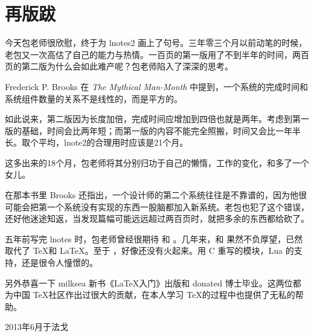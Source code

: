 \chapter{再版跋}

今天包老师很欣慰，终于为 lnotes2 画上了句号。三年零三个月以前动笔的时候，老包又一次高估了自己的能力与热情。一百页的第一版用了不到半年的时间，两百页的第二版为什么会如此难产呢？包老师陷入了深深的思考。

Frederick P. Brooks 在 \emph{The Mythical Man-Month} 中提到，一个系统的完成时间和系统组件数量的关系不是线性的，而是平方的。

如此说来，第二版因为长度加倍，完成时间应增加到四倍也就是两年。考虑到第一版的基础，时间会比两年短；而第一版的内容不能完全照搬，时间又会比一年半长。取个平均，lnote2的合理用时应该是21个月。

这多出来的18个月，包老师将其分别归功于自己的懒惰，工作的变化，和多了一个女儿。

在那本书里 Brooks 还指出，一个设计师的第二个系统往往是不靠谱的，因为他很可能会把第一个系统没有实现的东西一股脑都加入新系统。老包也犯了这个错误，还好他迷途知返，当发现篇幅可能远远超过两百页时，就把多余的东西都给砍了。

五年前写完 lnotes 时，包老师曾经很期待 \XeTeX 和 \LuaTeX。几年来，\XeTeX 和 \XeLaTeX 果然不负厚望，已然取代了 \TeX 和 \LaTeX。至于 \LuaTeX，好像还没有火起来。用 C 重写的模块，Lua 的支持，还是很令人憧憬的。

另外恭喜一下 milksea 新书《\LaTeX 入门》出版和 donated 博士毕业。这两位都为中国 \TeX 社区作出过很大的贡献，在本人学习 \TeX 的过程中也提供了无私的帮助。

\begin{flushright}
  2013年6月于法戈
\end{flushright}

